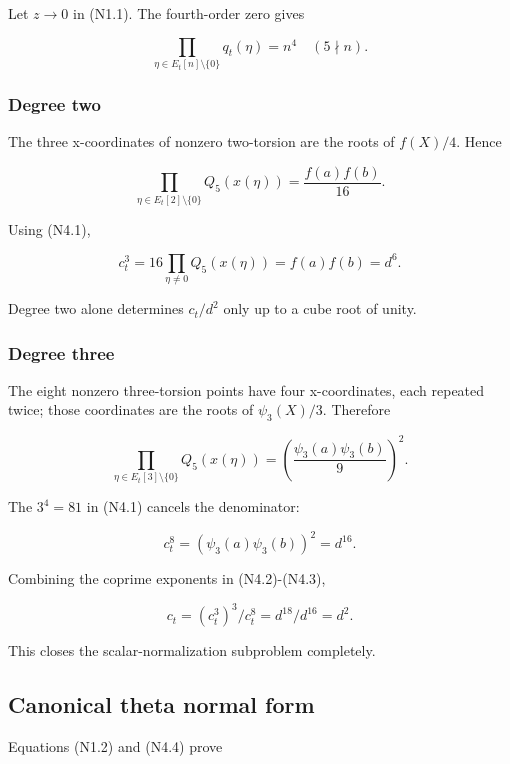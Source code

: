 Let \(z\to0\) in (N1.1). The fourth-order zero gives

\[
 \boxed{\prod_{\eta\in E_t[n]\setminus\{0\}}q_t(\eta)=n^4}
 \quad(5\nmid n).                                      \tag{N4.1}
\]

\hypertarget{N-degree-two}{%
\subsubsection{Degree two}\label{N-degree-two}}

The three x-coordinates of nonzero two-torsion are the roots of
\(f(X)/4\). Hence

\[
 \prod_{\eta\in E_t[2]\setminus\{0\}}Q_5(x(\eta))
 =\frac{f(a)f(b)}{16}.
\]

Using (N4.1),

\[
 c_t^3=16\prod_{\eta\ne0}Q_5(x(\eta))=f(a)f(b)=d^6.       \tag{N4.2}
\]

Degree two alone determines \(c_t/d^2\) only up to a cube root of unity.

\hypertarget{N-degree-three}{%
\subsubsection{Degree three}\label{N-degree-three}}

The eight nonzero three-torsion points have four x-coordinates, each
repeated twice; those coordinates are the roots of \(\psi_3(X)/3\).
Therefore

\[
 \prod_{\eta\in E_t[3]\setminus\{0\}}Q_5(x(\eta))
 =\left(\frac{\psi_3(a)\psi_3(b)}9\right)^2.
\]

The \(3^4=81\) in (N4.1) cancels the denominator:

\[
 c_t^8=(\psi_3(a)\psi_3(b))^2=d^{16}.                    \tag{N4.3}
\]

Combining the coprime exponents in (N4.2)-(N4.3),

\[
 \boxed{c_t=(c_t^3)^3/c_t^8=d^{18}/d^{16}=d^2.}           \tag{N4.4}
\]

This closes the scalar-normalization subproblem completely.

\hypertarget{N-canonical-theta-normal-form}{%
\subsection{Canonical theta normal
form}\label{N-canonical-theta-normal-form}}

Equations (N1.2) and (N4.4) prove

